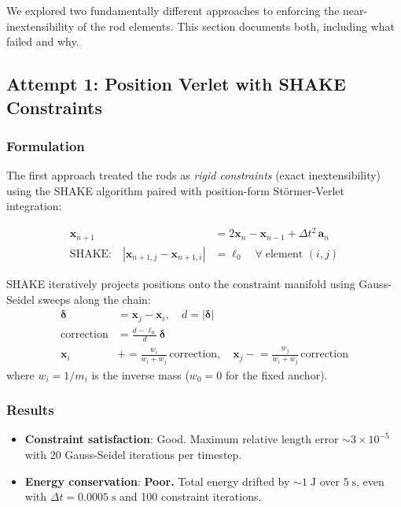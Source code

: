 \documentclass[11pt,a4paper]{article}
\begin{document}
We explored two fundamentally different approaches to enforcing the
near-inextensibility of the rod elements. This section documents both,
including what failed and why.

\subsection{Attempt 1: Position Verlet with SHAKE Constraints}
\label{sec:shake}

\subsubsection{Formulation}

The first approach treated the rods as \emph{rigid constraints} (exact
inextensibility) using the SHAKE algorithm paired with position-form
St\"ormer-Verlet integration:

\begin{align}
    \mathbf{x}_{n+1} &= 2\mathbf{x}_n - \mathbf{x}_{n-1}
                        + \Delta t^2 \, \mathbf{a}_n
    \label{eq:verlet_pos} \\
    \text{SHAKE:}\quad
    |\mathbf{x}_{n+1,j} - \mathbf{x}_{n+1,i}| &= \ell_0
    \quad \forall\; \text{element } (i,j)
    \label{eq:shake}
\end{align}

SHAKE iteratively projects positions onto the constraint manifold using
Gauss-Seidel sweeps along the chain:
\begin{align}
    \boldsymbol{\delta} &= \mathbf{x}_j - \mathbf{x}_i, \quad
    d = |\boldsymbol{\delta}| \\
    \text{correction} &= \frac{d - \ell_0}{d} \, \boldsymbol{\delta} \\
    \mathbf{x}_i &\mathrel{+}= \frac{w_i}{w_i + w_j} \, \text{correction}, \quad
    \mathbf{x}_j \mathrel{-}= \frac{w_j}{w_i + w_j} \, \text{correction}
\end{align}
where $w_i = 1/m_i$ is the inverse mass ($w_0 = 0$ for the fixed anchor).

\subsubsection{Results}

\begin{itemize}
    \item \textbf{Constraint satisfaction}: Good.
          Maximum relative length error $\sim 3 \times 10^{-5}$ with 20
          Gauss-Seidel iterations per timestep.
    \item \textbf{Energy conservation}: \textbf{Poor.}
          Total energy drifted by $\sim 1\;\text{J}$ over $5\;\text{s}$,
          even with $\Delta t = 0.0005\;\text{s}$ and 100 constraint
          iterations.
\end{itemize}
\end{document}
